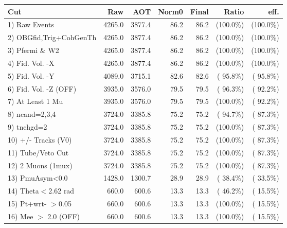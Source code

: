  \begin{table}[h!]\centering
 \begin{tabular}{||l||r|r|r|r|r|r||}
 \hline
 \hline
 Cut & Raw & AOT & Norm0 & Final & Ratio & eff.       \\
 \hline
  1) Raw Events           &       4265.0 &       3877.4 &         86.2 &         86.2 & (100.0\%) & (100.0\%) \\
  2) OBGfid,Trig+CohGenTh &       4265.0 &       3877.4 &         86.2 &         86.2 & (100.0\%) & (100.0\%) \\
  3) Pfermi \& W2         &       4265.0 &       3877.4 &         86.2 &         86.2 & (100.0\%) & (100.0\%) \\
  4) Fid. Vol. -X         &       4265.0 &       3877.4 &         86.2 &         86.2 & (100.0\%) & (100.0\%) \\
  5) Fid. Vol. -Y         &       4089.0 &       3715.1 &         82.6 &         82.6 & ( 95.8\%) & ( 95.8\%) \\
  6) Fid. Vol. -Z (OFF)   &       3935.0 &       3576.0 &         79.5 &         79.5 & ( 96.3\%) & ( 92.2\%) \\
  7) At Least 1 Mu        &       3935.0 &       3576.0 &         79.5 &         79.5 & (100.0\%) & ( 92.2\%) \\
  8) ncand=2,3,4          &       3724.0 &       3385.8 &         75.2 &         75.2 & ( 94.7\%) & ( 87.3\%) \\
  9) tnchgd=2             &       3724.0 &       3385.8 &         75.2 &         75.2 & (100.0\%) & ( 87.3\%) \\
 10) +/- Tracks (V0)      &       3724.0 &       3385.8 &         75.2 &         75.2 & (100.0\%) & ( 87.3\%) \\
 11) Tube/Veto Cut        &       3724.0 &       3385.8 &         75.2 &         75.2 & (100.0\%) & ( 87.3\%) \\
 12) 2 Muons (1mux)       &       3724.0 &       3385.8 &         75.2 &         75.2 & (100.0\%) & ( 87.3\%) \\
 13) PmuAsym<0.0          &       1428.0 &       1300.7 &         28.9 &         28.9 & ( 38.4\%) & ( 33.5\%) \\
 14) Theta$<$2.62 rad     &        660.0 &        600.6 &         13.3 &         13.3 & ( 46.2\%) & ( 15.5\%) \\
 15) Pt+wrt- $>$0.05      &        660.0 &        600.6 &         13.3 &         13.3 & (100.0\%) & ( 15.5\%) \\
 16) Mee $>$ 2.0  (OFF)   &        660.0 &        600.6 &         13.3 &         13.3 & (100.0\%) & ( 15.5\%) \\

\end{tabular}
\end{table}
